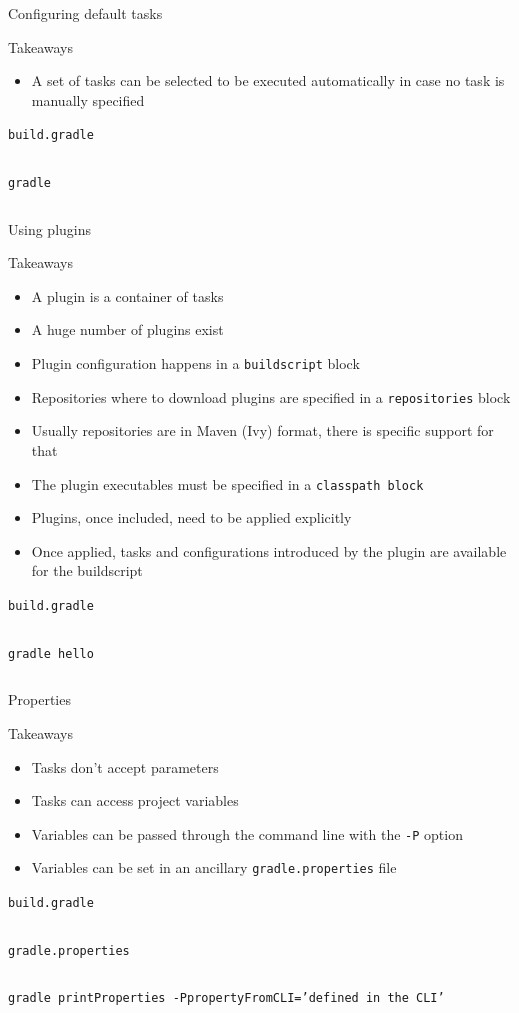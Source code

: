 \documentclass[presentation]{beamer}
\newcommand{\codefile}[4]{
	\begin{block}{\texttt{#2}}
		\inputminted[fontsize=#3,linenos=true,breaklines=true]{#4}{"workspace/#1/#2"}
	\end{block}
}
\newcommand{\groovy}[3]{\codefile{#1}{#2}{#3}{groovy}}
\newcommand{\terminal}[3]{\codefile{#1}{#2}{#3}{text}}
\newcommand{\tinier}{\fontsize{4pt}{5pt}\selectfont}
\begin{document}
\begin{frame}{Configuring default tasks}
    \begin{block}{Takeaways}
        \begin{itemize}
            \item A set of tasks can be selected to be executed automatically in case no task is manually specified
        \end{itemize}
    \end{block}
    \groovy{07-DefaultTasks}{build.gradle}{\scriptsize}
    \terminal{07-DefaultTasks}{gradle}{\tinier}
\end{frame}

\begin{frame}{Using plugins}
    \begin{block}{Takeaways}
        \begin{itemize}
            \item A plugin is a container of tasks
            \item A huge number of plugins exist
            \item Plugin configuration happens in a \texttt{buildscript} block
            \item Repositories where to download plugins are specified in a \texttt{repositories} block
            \item Usually repositories are in Maven (Ivy) format, there is specific support for that
            \item The plugin executables must be specified in a \texttt{classpath block}
            \item Plugins, once included, need to be applied explicitly
            \item Once applied, tasks and configurations introduced by the plugin are available for the buildscript
        \end{itemize}
    \end{block}
    \groovy{08-Plugin}{build.gradle}{\scriptsize}
    \terminal{08-Plugin}{gradle hello}{\tinier}
\end{frame}

\begin{frame}{Properties}
    \begin{block}{Takeaways}
        \begin{itemize}
            \item Tasks don't accept parameters
            \item Tasks can access project variables
            \item Variables can be passed through the command line with the \texttt{-P} option
            \item Variables can be set in an ancillary \texttt{gradle.properties} file
        \end{itemize}
    \end{block}
    \groovy{09-Properties}{build.gradle}{\scriptsize}
    \terminal{09-Properties}{gradle.properties}{\scriptsize}
    \terminal{09-Properties}{gradle printProperties -PpropertyFromCLI='defined in the CLI'}{\normalsize}
\end{frame}
\end{document}
